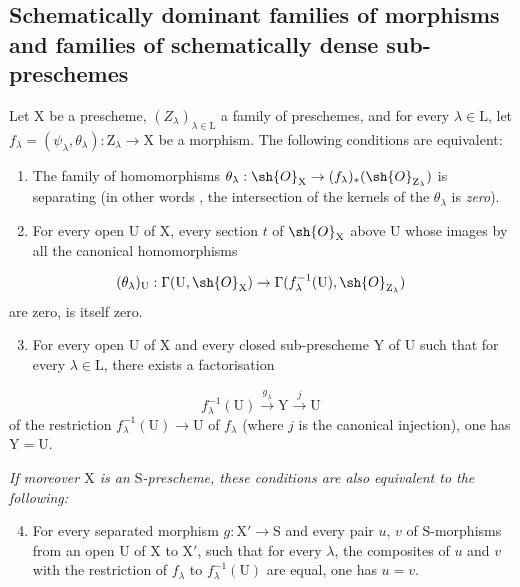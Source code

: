 \subsection{Schematically dominant families of morphisms and families of schematically dense sub-preschemes}
\label{subsection:IV.11.10}

\begin{proposition}[11.10.1]
\label{IV.11.10.1}
Let $\mathrm{X}$ be a prescheme, $(Z_\lambda)_{\lambda\in\mathrm{L}}$ a family of preschemes, and for every $\lambda\in\mathrm{L}$, let $f_\lambda=(\psi_\lambda,\theta_\lambda):\mathrm{Z}_\lambda\to\mathrm{X}$ be a morphism.
The following conditions are equivalent:
\begin{enumerate}[label=\emph{\alph*)}]
  \item The family of homomorphisms $\theta_\lambda:\sh{O}_\mathrm{X}\to(f_\lambda)_*(\sh{O}_{\mathrm{Z}_\lambda})$ is separating (in other words , the intersection of the kernels of the $\theta_\lambda$ is \emph{zero}).
  \item For every open $\mathrm{U}$ of $\mathrm{X}$, every section $t$ of $\sh{O}_\mathrm{X}$ above $\mathrm{U}$ whose images by all the canonical homomorphisms
\end{enumerate}
\[
  (\theta_\lambda)_\mathrm{U}:\Gamma(\mathrm{U},\sh{O}_\mathrm{X})\to\Gamma(f_\lambda^{-1}(\mathrm{U}),\sh{O}_{\mathrm{Z}_\lambda})
\label{IV.11.10.1.1}
\]
are zero, is itself zero.
\begin{enumerate}[label=\emph{\alph*)}]
\setcounter{enumi}{2}
  \item For every open $\mathrm{U}$ of $\mathrm{X}$ and every closed sub-prescheme $\mathrm{Y}$ of $\mathrm{U}$ such that for every $\lambda\in\mathrm{L}$, there exists a factorisation
\end{enumerate}
\[
  f_\lambda^{-1}(\mathrm{U})\xrightarrow{g_\lambda}\mathrm{Y}\xrightarrow{j}\mathrm{U}
\label{IV.11.10.1.2}
\]
of the restriction $f_\lambda^{-1}(\mathrm{U})\to\mathrm{U}$ of $f_\lambda$ (where $j$ is the canonical injection), one has $\mathrm{Y}=\mathrm{U}$.

\emph{If moreover $\mathrm{X}$ is an $\mathrm{S}$-prescheme, these conditions are also equivalent to the following:}
\begin{enumerate}[label=\emph{\alph*)}]
\setcounter{enumi}{3}
  \item For every separated morphism $g:\mathrm{X}'\to\mathrm{S}$ and every pair $u$, $v$ of $\mathrm{S}$-morphisms from an open $\mathrm{U}$ of $\mathrm{X}$ to $\mathrm{X}'$, such that for every $\lambda$, the composites of $u$ and $v$ with the restriction of $f_\lambda$ to $f_\lambda^{-1}(\mathrm{U})$ are equal, one has $u=v$.
\end{enumerate}
\end{proposition}

